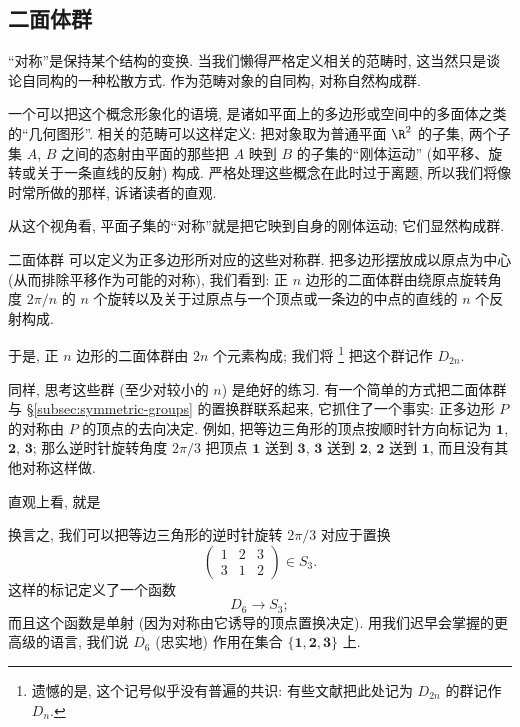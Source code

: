 \subsection{二面体群}
\label{subsec:dihedral-groups}

``对称''是保持某个结构的变换. 当我们懒得严格定义相关的范畴时, 这当然只是谈论自同构的一种松散方式. 作为范畴对象的自同构, 对称自然构成群.

一个可以把这个概念形象化的语境, 是诸如平面上的多边形或空间中的多面体之类的``几何图形''. 相关的范畴可以这样定义: 把对象取为普通平面 $\R^2$ 的子集, 两个子集 $A$, $B$ 之间的态射由平面的那些把 $A$ 映到 $B$ 的子集的``刚体运动'' (如平移、旋转或关于一条直线的反射) 构成. 严格处理这些概念在此时过于离题, 所以我们将像时常所做的那样, 诉诸读者的直观.

从这个视角看, 平面子集的``对称''就是把它映到自身的刚体运动; 它们显然构成群.

二面体群%
可以定义为正多边形所对应的这些对称群. 把多边形摆放成以原点为中心 (从而排除平移作为可能的对称), 我们看到: 正 $n$ 边形的二面体群由绕原点旋转角度 $2\pi/n$ 的 $n$ 个旋转以及关于过原点与一个顶点或一条边的中点的直线的 $n$ 个反射构成.

于是, 正 $n$ 边形的二面体群由 $2n$ 个元素构成; 我们将%
\footnote{遗憾的是, 这个记号似乎没有普遍的共识: 有些文献把此处记为 $D_{2n}$ 的群记作 $D_n$.}%
把这个群记作 $D_{2n}$.

同样, 思考这些群 (至少对较小的 $n$) 是绝好的练习. 有一个简单的方式把二面体群与 \S\ref{subsec:symmetric-groups} 的置换群联系起来, 它抓住了一个事实: 正多边形 $P$ 的对称由 $P$ 的顶点的去向决定. 例如, 把等边三角形的顶点按顺时针方向标记为 $\mathbf{1}$, $\mathbf{2}$, $\mathbf{3}$; 那么逆时针旋转角度 $2\pi/3$ 把顶点 $\mathbf{1}$ 送到 $\mathbf{3}$, $\mathbf{3}$ 送到 $\mathbf{2}$, $\mathbf{2}$ 送到 $\mathbf{1}$, 而且没有其他对称这样做.

直观上看, 就是
\begin{center}
\end{center}
换言之, 我们可以把等边三角形的逆时针旋转 $2\pi/3$ 对应于置换
\[
\begin{pmatrix} 1 & 2 & 3 \\ 3 & 1 & 2 \end{pmatrix} \in S_3.
\]
这样的标记定义了一个函数
\[
D_6 \rightarrow S_3;
\]
而且这个函数是单射 (因为对称由它诱导的顶点置换决定). 用我们迟早会掌握的更高级的语言, 我们说 $D_6$ (忠实地) 作用在集合 $\{\mathbf{1}, \mathbf{2}, \mathbf{3}\}$ 上.

